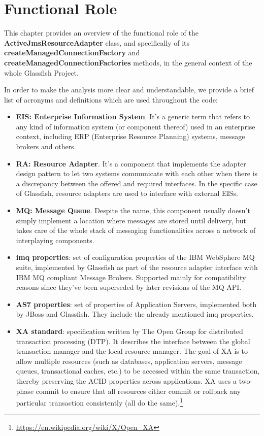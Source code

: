 \chapter{Functional Role}
This chapter provides an overview of the functional role of the \textbf{ActiveJmsResourceAdapter} class, and specifically of its \textbf{createManagedConnectionFactory} and \textbf{createManagedConnectionFactories} methods, in the general context of the whole Glassfish Project.

In order to make the analysis more clear and understandable, we provide a brief list of acronyms and definitions which are used throughout the code:
\begin{itemize}
	\item \textbf{EIS: Enterprise Information System}. It's a generic term that refers to any kind of information system (or component thereof) used in an enterprise context, including ERP (Enterprise Resource Planning) systems, message brokers and others.
	\item \textbf{RA: Resource Adapter}. It's a component that implements the adapter design pattern to let two systems communicate with each other when there is a discrepancy between the offered and required interfaces. In the specific case of Glassfish, resource adapters are used to interface with external EISs.
	\item \textbf{MQ: Message Queue}. Despite the name, this component usually doesn't simply implement a location where messages are stored until delivery, but takes care of the whole stack of messaging functionalities across a network of interplaying components. 
	\item \textbf{imq properties}: set of configuration properties of the IBM WebSphere MQ suite, implemented by Glassfish as part of the resource adapter interface with IBM MQ compliant Message Brokers. Supported mainly for compatibility reasons since they've been superseded by later revisions of the MQ API. 
	\item \textbf{AS7 properties}: set of properties of Application Servers, implemented both by JBoss and Glassfish. They include the already mentioned imq properties. 
	\item \textbf{XA standard}: specification written by The Open Group for distributed transaction processing (DTP). It describes the interface between the global transaction manager and the local resource manager. The goal of XA is to allow multiple resources (such as databases, application servers, message queues, transactional caches, etc.) to be accessed within the same transaction, thereby preserving the ACID properties across applications. XA uses a two-phase commit to ensure that all resources either commit or rollback any particular transaction consistently (all do the same).\footnote{\url{https://en.wikipedia.org/wiki/X/Open_XA}}

\end{itemize}
